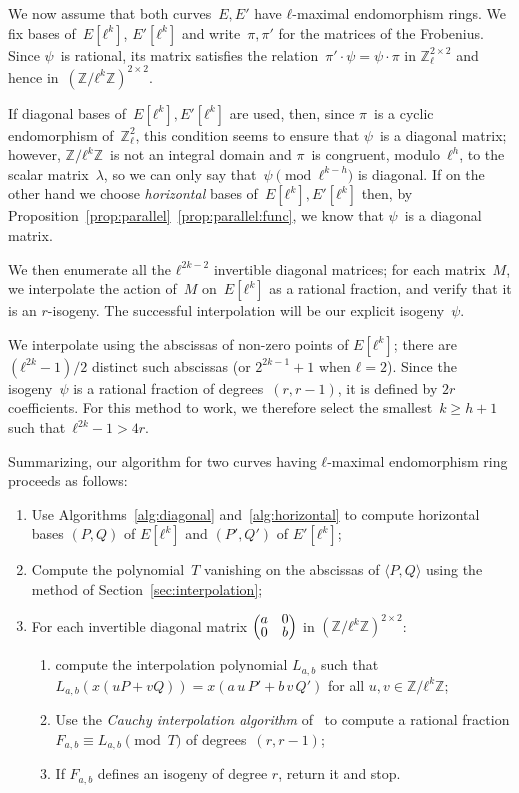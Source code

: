 \documentclass{lms}
\def\mat#1{\begin{pmatrix}#1\end{pmatrix}}
\def\smat#1{{\def\arraystretch{.7}\mat{#1}}}
\begin{document}
We now assume that both curves~$E, E'$
have $ℓ$-maximal endomorphism rings.
We fix bases of~$E[ℓ^k]$, $E'[ℓ^k]$ and write~$π, π'$ for the matrices
of the Frobenius.
Since $ψ$~is rational, its matrix satisfies the relation~$π' · ψ = ψ · π$
in $ℤ_ℓ^{2×2}$ and hence in~$(ℤ/ℓ^k ℤ)^{2 × 2}$.

If diagonal bases of~$E[ℓ^k], E'[ℓ^k]$ are used, then,
since $π$~is a cyclic endomorphism of~$ℤ_ℓ^2$,
this condition seems to ensure that $ψ$~is a diagonal matrix;
however, $ℤ/ℓ^k ℤ$~is not an integral domain
and $π$~is congruent, modulo~$ℓ^h$, to the scalar matrix~$λ$,
so we can only say that~$ψ\pmod{ℓ^{k-h}}$ is diagonal.
If on the other hand we choose \emph{horizontal} bases
of~$E[ℓ^k], E'[ℓ^k]$ then, by Proposition~\ref{prop:parallel}~\ref{prop:parallel:func},
we know that $ψ$~is a diagonal matrix.

We then enumerate all the $ℓ^{2k-2}$ invertible diagonal matrices; for
each matrix~$M$, we interpolate the action of~$M$ on~$E[ℓ^k]$ as a
rational fraction, and verify that it is an $r$-isogeny. The
successful interpolation will be our explicit isogeny~$ψ$.

We interpolate using the abscissas of non-zero points of $E[ℓ^k]$;
there are $(ℓ^{2k}-1)/2$ distinct such abscissas (or $2^{2k-1}+1$ when
$ℓ=2$).  Since the isogeny~$ψ$ is a rational fraction of
degrees~$(r, r-1)$, it is defined by $2r$ coefficients.  For this
method to work, we therefore select the smallest~$k ≥ h+1$ such
that~$ℓ^{2k}-1 > 4r$.

Summarizing, our algorithm for two curves having $ℓ$-maximal
endomorphism ring proceeds as follows:
\begin{enumerate}
\item\label{alg:ours:horizontal} Use Algorithms~\ref{alg:diagonal}
  and~\ref{alg:horizontal} to compute horizontal bases $(P,Q)$ of
  $E[ℓ^k]$ and $(P',Q')$ of $E'[ℓ^k]$;
\item\label{alg:ours:T} Compute the polynomial~$T$ vanishing
  on the abscissas of $\langle P,Q\rangle$ using the method of
  Section~\ref{sec:interpolation};
\item\label{alg:ours:for} For each invertible diagonal matrix
  $\smat{a&0\\0&b}$ in $(ℤ/ℓ^k ℤ)^{2×2}$:
  \begin{enumerate}
  \item\label{alg:ours:interp} compute the interpolation polynomial
    $L_{a,b}$ such that
    $L_{a,b} (x (u P + v Q)) = x(a\, u\,P' + b\,v\, Q')$ for all
    $u, v ∈ ℤ/ℓ^k ℤ$;
  \item\label{alg:ours:cauchy} Use the \emph{Cauchy interpolation
      algorithm} of~\cite[Chapter~5.8]{vzGG} to compute a rational
    fraction $F_{a,b}≡L_{a,b}\pmod{T}$ of degrees~$(r, r-1)$;
  \item If $F_{a,b}$ defines an isogeny of degree $r$, return it and
    stop.
  \end{enumerate}
\end{enumerate}
\end{document}
